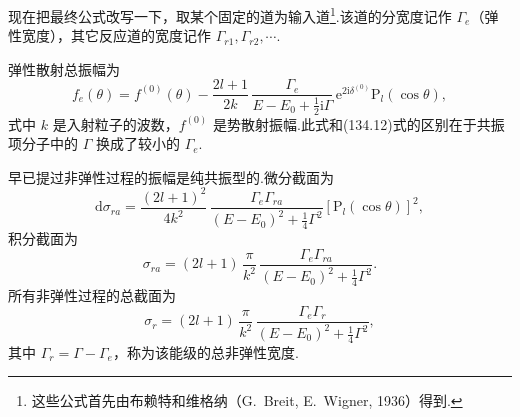 现在把最终公式改写一下，取某个固定的道为输入道\footnote{这些公式首先由布赖特和维格纳（G.~Breit, E.~Wigner, 1936）得到.}.该道的分宽度记作 $\Gamma_e$（弹性宽度），其它反应道的宽度记作 $\Gamma_{r1},\Gamma_{r2},\cdots$.

弹性散射总振幅为
\begin{equation}
  f_e(\theta)=f^{(0)}(\theta)-\frac{2l+1}{2k}\,
  \frac{\Gamma_e}{E-E_0+\frac{1}{2}\mathrm{i}\Gamma}\,
  \mathrm{e}^{2\mathrm{i}\delta^{(0)}}\mathrm{P}_l(\cos\theta),
\end{equation}
式中 $k$ 是入射粒子的波数，$f^{(0)}$ 是势散射振幅.此式和(134.12)式的区别在于共振项分子中的 $\Gamma$ 换成了较小的 $\Gamma_e$.

早已提过非弹性过程的振幅是纯共振型的.微分截面为
\begin{equation}
  \mathrm{d}\sigma_{ra}=\frac{(2l+1)^2}{4k^2}\,
  \frac{\Gamma_e\Gamma_{ra}}{(E-E_0)^2+\frac{1}{4}\Gamma^2}
  \left[\mathrm{P}_l(\cos\theta)\right]^2,
\end{equation}
积分截面为
\begin{equation}
  \sigma_{ra}=(2l+1)\,\frac{\pi}{k^2}\,
  \frac{\Gamma_e\Gamma_{ra}}{(E-E_0)^2+\frac{1}{4}\Gamma^2}.
\end{equation}
所有非弹性过程的总截面为
\begin{equation}
  \sigma_r=(2l+1)\,\frac{\pi}{k^2}\,
  \frac{\Gamma_e\Gamma_r}{(E-E_0)^2+\frac{1}{4}\Gamma^2},
\end{equation}
其中 $\Gamma_r=\Gamma-\Gamma_e$，称为该能级的总非弹性宽度.


